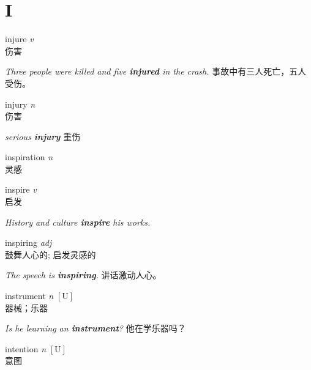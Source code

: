 \section{I}

\item[] {
    \lettrine{injure}{}  
    \textit{v} 
    \\
    伤害

    \textit{Three people were killed and five \textbf{injured} in the crash.}
    事故中有三人死亡，五人受伤。

} 

\item[] {
    \lettrine{injury}{}  
    \textit{n} 
    \\
    伤害

    \textit{serious \textbf{injury}}
    重伤

} 

\item[] {
    \lettrine{inspiration}{}  
    \textit{n} 
    \\
    灵感

} 

\item[] {
    \lettrine{inspire}{}  
    \textit{v} 
    \\
    启发

    \textit{History and culture \textbf{inspire} his works. }

} 

\item[] {
    \lettrine{inspiring}{}  
    \textit{adj} 
    \\
    鼓舞人心的; 启发灵感的

    \textit{The speech is \textbf{inspiring}. }
    讲话激动人心。

} 

\item[] {
    \lettrine{instrument}{}  
    \textit{n} 
    $\mathrm{[U]}$ 
    \\
    器械；乐器

    \textit{Is he learning an \textbf{instrument}?}
    他在学乐器吗？

}

\item[] {
    \lettrine{intention}{}  
    \textit{n} 
    $\mathrm{[U]}$ 
    \\
    意图

}
